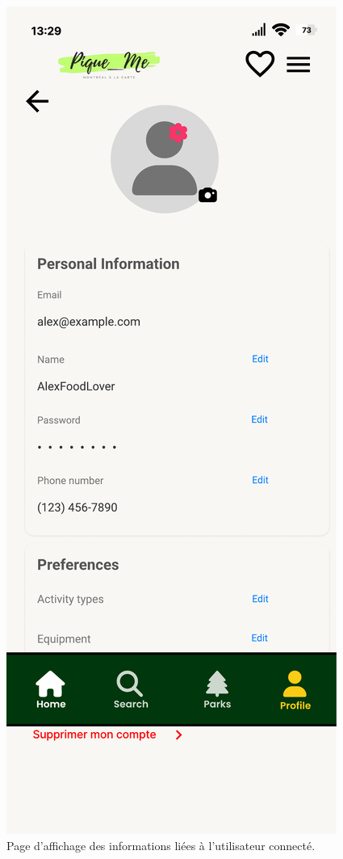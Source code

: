\documentclass[12pt,a4paper]{article}
\begin{document}
\begin{figure}[h!]
  \centering
  \includegraphics[width=0.9\linewidth]{attachments/PageUser.pdf}
  \caption{Page d'affichage des informations liées à l'utilisateur connecté.}
\end{figure}
\end{document}
